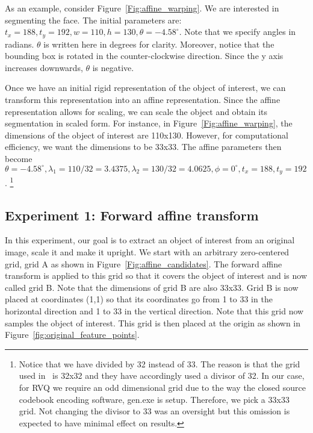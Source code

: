 As an example, consider Figure~\ref{Fig:affine_warping}.  We are interested in segmenting the face.  The initial parameters are: $t_x=188, t_y=192, w=110, h=130, \theta=-4.58^\circ$.  Note that we specify angles in radians.  $\theta$ is written here in degrees for clarity.  Moreover, notice that the bounding box is rotated in the counter-clockwise direction.  Since the y axis increases downwards, $\theta$ is negative.

Once we have an initial rigid representation of the object of interest, we can transform this representation into an affine representation.  Since the affine representation allows for scaling, we can scale the object and obtain its segmentation in scaled form.  For instance, in Figure~\ref{Fig:affine_warping}, the dimensions of the object of interest are 110x130.  However, for computational efficiency, we want the dimensions to be 33x33.  The affine parameters then become $\theta=-4.58^\circ, \lambda_1=110/32=3.4375, \lambda_2=130/32=4.0625, \phi=0^\circ, t_x=188, t_y=192$.  \footnote{Notice that we have divided by 32 instead of 33.  The reason is that the grid used in~\cite{2008_JNL_subspaceTRK_Ross} is 32x32 and they have accordingly used a divisor of 32.  In our case, for RVQ we require an odd dimensional grid due to the way the closed source codebook encoding software, gen.exe is setup.  Therefore, we pick a 33x33 grid.  Not changing the divisor to 33 was an oversight but this omission is expected to have minimal effect on results.}


\subsection{Experiment 1: Forward affine transform}
In this experiment, our goal is to extract an object of interest from an original image, scale it and make it upright.  We start with an arbitrary zero-centered grid, grid A as shown in Figure~\ref{Fig:affine_candidates}.  The forward affine transform is applied to this grid so that it covers the object of interest and is now called grid B.  Note that the dimensions of grid B are also 33x33.  Grid B is now placed at coordinates (1,1) so that its coordinates go from 1 to 33 in the horizontal direction and 1 to 33 in the vertical direction.  Note that this grid now samples the object of interest.  This grid is then placed at the origin as shown in Figure~\ref{fig:original_feature_points}.  

